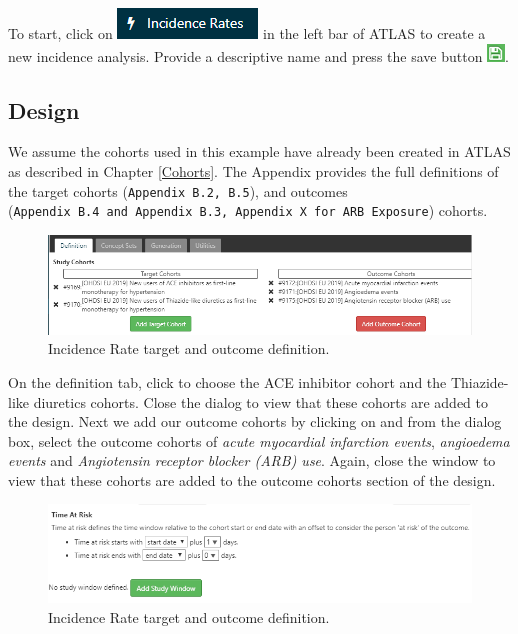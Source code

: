 \documentclass[11pt]{book}
\theoremstyle{definition}
\theoremstyle{definition}
\theoremstyle{definition}
\theoremstyle{remark}
\begin{document}
To start, click on \includegraphics{images/Characterization/atlasIncidenceMenuItem.png} in the left bar of ATLAS to create a new incidence analysis. Provide a descriptive name and press the save button \includegraphics{images/PopulationLevelEstimation/save.png}.

\hypertarget{design-2}{%
\subsection{Design}\label{design-2}}

We assume the cohorts used in this example have already been created in ATLAS as described in Chapter \ref{Cohorts}. The Appendix provides the full definitions of the target cohorts (\texttt{Appendix\ B.2,\ B.5}), and outcomes (\texttt{Appendix\ B.4\ and\ Appendix\ B.3,\ Appendix\ X\ for\ ARB\ Exposure}) cohorts.

\begin{figure}

{\centering \includegraphics[width=1\linewidth]{images/Characterization/atlasIncidenceCohortSelection} 

}

\caption{Incidence Rate target and outcome definition.}\label{fig:atlasIncidenceCohortSelection}
\end{figure}

On the definition tab, click to choose the ACE inhibitor cohort and the Thiazide-like diuretics cohorts. Close the dialog to view that these cohorts are added to the design. Next we add our outcome cohorts by clicking on and from the dialog box, select the outcome cohorts of \emph{acute myocardial infarction events}, \emph{angioedema events} and \emph{Angiotensin receptor blocker (ARB) use}. Again, close the window to view that these cohorts are added to the outcome cohorts section of the design.

\begin{figure}

{\centering \includegraphics[width=1\linewidth]{images/Characterization/atlasIncidenceTimeAtRisk} 

}

\caption{Incidence Rate target and outcome definition.}\label{fig:atlasIncidenceTimeAtRisk}
\end{figure}
\end{document}

